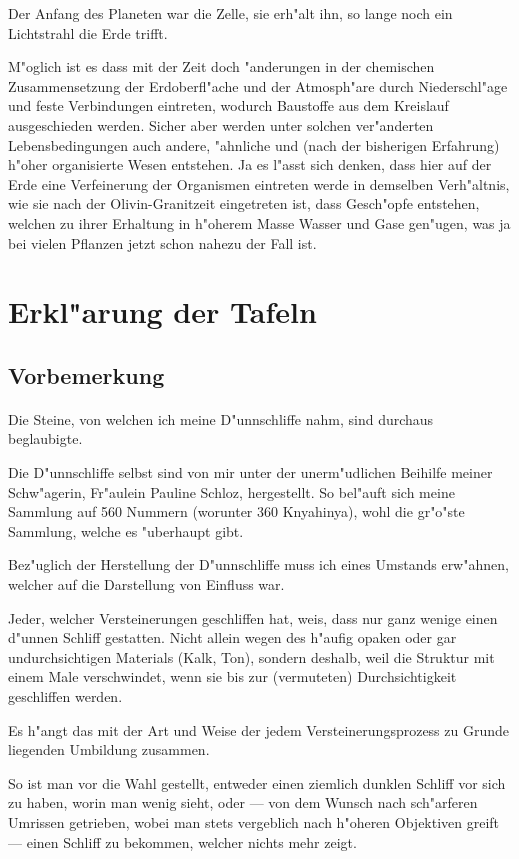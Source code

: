 \documentclass[a4paper, 11pt, oneside]{article}
\begin{document}
Der Anfang des Planeten war die Zelle, sie erh"alt ihn, so lange noch ein Lichtstrahl die Erde trifft.

M"oglich ist es dass mit der Zeit doch "anderungen in der chemischen Zusammensetzung der Erdoberfl"ache und der Atmosph"are durch Niederschl"age und feste Verbindungen eintreten, wodurch Baustoffe aus dem Kreislauf ausgeschieden werden. Sicher aber werden unter solchen ver"anderten Lebensbedingungen auch andere, "ahnliche und (nach der bisherigen Erfahrung) h"oher organisierte Wesen entstehen. Ja es l"asst sich denken, dass hier auf der Erde eine Verfeinerung der Organismen eintreten werde in demselben Verh"altnis, wie sie nach der Olivin-Granitzeit eingetreten ist, dass Gesch"opfe entstehen, welchen zu ihrer Erhaltung in h"oherem Masse Wasser und Gase gen"ugen, was ja bei vielen Pflanzen jetzt schon nahezu der Fall ist.
\clearpage
\section{Erkl"arung der Tafeln}
\subsection{Vorbemerkung}
\paragraph{}
Die Steine, von welchen ich meine D"unnschliffe nahm, sind durchaus beglaubigte.

Die D"unnschliffe selbst sind von mir unter der unerm"udlichen Beihilfe meiner Schw"agerin, Fr"aulein Pauline Schloz, hergestellt. So bel"auft sich meine Sammlung auf 560 Nummern (worunter 360 Knyahinya), wohl die gr"o"ste Sammlung, welche es "uberhaupt gibt.

Bez"uglich der Herstellung der D"unnschliffe muss ich eines Umstands erw"ahnen, welcher auf die Darstellung von Einfluss war.

Jeder, welcher Versteinerungen geschliffen hat, weis, dass nur ganz wenige einen d"unnen Schliff gestatten. Nicht allein wegen des h"aufig opaken oder gar undurchsichtigen Materials (Kalk, Ton), sondern deshalb, weil die Struktur mit einem Male verschwindet, wenn sie bis zur (vermuteten) Durchsichtigkeit geschliffen werden.

Es h"angt das mit der Art und Weise der jedem Versteinerungsprozess zu Grunde liegenden Umbildung zusammen.

So ist man vor die Wahl gestellt, entweder einen ziemlich dunklen Schliff vor sich zu haben, worin man wenig sieht, oder --- von dem Wunsch nach sch"arferen Umrissen getrieben, wobei man stets vergeblich nach h"oheren Objektiven greift --- einen Schliff zu bekommen, welcher nichts mehr zeigt.
\end{document}

